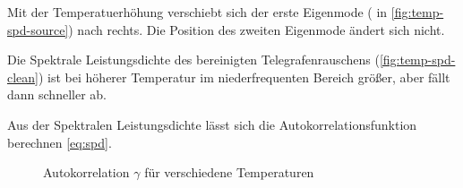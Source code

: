 \documentclass[main.tex]{subfiles}
\begin{document}
Mit der Temperatuerhöhung verschiebt sich der  erste Eigenmode ( in \cref{fig:temp-spd-source}) nach rechts. 
Die Position des zweiten Eigenmode ändert sich nicht.


Die Spektrale Leistungsdichte des bereinigten Telegrafenrauschens (\cref{fig:temp-spd-clean}) ist bei höherer Temperatur im niederfrequenten Bereich größer, aber fällt dann schneller ab.

Aus der Spektralen Leistungsdichte lässt sich die Autokorrelationsfunktion berechnen \cref*{eq:spd}.

\begin{figure}[H]
    \centering
    \caption{Autokorrelation $\gamma$ für verschiedene Temperaturen }\label{fig:temp-autocorr}
\end{figure}
\end{document}
